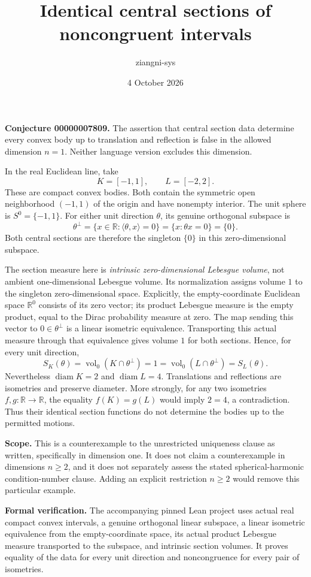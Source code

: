 \documentclass[11pt]{article}
\title{Identical central sections of noncongruent intervals}
\author{ziangni-sys}
\date{4 October 2026}
\begin{document}
\maketitle
\noindent\textbf{Conjecture 00000007809.} The assertion that central section data determine every convex body up to translation and reflection is false in the allowed dimension $n=1$. Neither language version excludes this dimension.

In the real Euclidean line, take
\[
 K=[-1,1],\qquad L=[-2,2].
\]
These are compact convex bodies. Both contain the symmetric open neighborhood $(-1,1)$ of the origin and have nonempty interior. The unit sphere is $S^0=\{-1,1\}$. For either unit direction $\theta$, its genuine orthogonal subspace is
\[
 \theta^\perp=\{x\in\mathbb R:\langle\theta,x\rangle=0\}
 =\{x:\theta x=0\}=\{0\}.
\]
Both central sections are therefore the singleton $\{0\}$ in this zero-dimensional subspace.

The section measure here is \emph{intrinsic zero-dimensional Lebesgue volume}, not ambient one-dimensional Lebesgue volume. Its normalization assigns volume $1$ to the singleton zero-dimensional space. Explicitly, the empty-coordinate Euclidean space $\mathbb R^0$ consists of its zero vector; its product Lebesgue measure is the empty product, equal to the Dirac probability measure at zero. The map sending this vector to $0\in\theta^\perp$ is a linear isometric equivalence. Transporting this actual measure through that equivalence gives volume $1$ for both sections. Hence, for every unit direction,
\[
 S_K(\theta)=\operatorname{vol}_0(K\cap\theta^\perp)=1
 =\operatorname{vol}_0(L\cap\theta^\perp)=S_L(\theta).
\]
Nevertheless $\operatorname{diam}K=2$ and $\operatorname{diam}L=4$. Translations and reflections are isometries and preserve diameter. More strongly, for any two isometries $f,g:\mathbb R\to\mathbb R$, the equality $f(K)=g(L)$ would imply $2=4$, a contradiction. Thus their identical section functions do not determine the bodies up to the permitted motions.

\noindent\textbf{Scope.} This is a counterexample to the unrestricted uniqueness clause as written, specifically in dimension one. It does not claim a counterexample in dimensions $n\geq2$, and it does not separately assess the stated spherical-harmonic condition-number clause. Adding an explicit restriction $n\geq2$ would remove this particular example.

\noindent\textbf{Formal verification.} The accompanying pinned Lean project uses actual real compact convex intervals, a genuine orthogonal linear subspace, a linear isometric equivalence from the empty-coordinate space, its actual product Lebesgue measure transported to the subspace, and intrinsic section volumes. It proves equality of the data for every unit direction and noncongruence for every pair of isometries.
\end{document}
